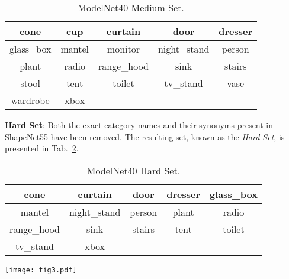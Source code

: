 \documentclass[sigconf]{acmart}
\begin{document}
\begin{table}[htb]
    \small
    \caption{ModelNet40 Medium Set.}
    \begin{tabular}{ccccc}
        \toprule
        cone& cup& curtain& door& dresser \\
        \midrule
        glass\_box& mantel& monitor& night\_stand& person \\
        \midrule
        plant& radio& range\_hood& sink& stairs \\
        \midrule
        stool& tent& toilet& tv\_stand& vase \\
        \midrule
        wardrobe& xbox \\
        \bottomrule
    \end{tabular}

    \label{tab:ModelNet40-Medium-Set}
\end{table}

\noindent\textbf{Hard Set}: Both the exact category names and their synonyms present in ShapeNet55 have been removed. The resulting set, known as the \emph{Hard Set}, is presented in Tab.~\ref{tab:ModelNet40-Hard-Set}.

\begin{table}[htb]
    \small
        \caption{ModelNet40 Hard Set.}
    \begin{tabular}{ccccc}
        \toprule
        cone& curtain& door& dresser& glass\_box \\
        \midrule
        mantel& night\_stand& person& plant& radio \\
        \midrule
        range\_hood& sink& stairs& tent& toilet \\
        \midrule
        tv\_stand& xbox \\
        \bottomrule
    \end{tabular}

    \label{tab:ModelNet40-Hard-Set}
\end{table}

\begin{figure*}[t]
\centering
\texttt{[image: fig3.pdf]}
\caption{The qualitative results of the real image to point cloud retrieval. Giving an image, We show the top-3 point cloud retrieval results from ModelNet40. All models perform well on the simple samples (the 1st row and the 3rd row). However, when it comes to the challenging samples (the 2nd row and the 4th row), JM3D demonstrates a more accurate retrieval ability compared to the previous state-of-the-art (ULIP). The JM3D trained with 4 view images shows better performance compared with the 2 view images, benefiting the more solid bias of vision modality.}
\label{fig3}
\end{figure*}
\end{document}
